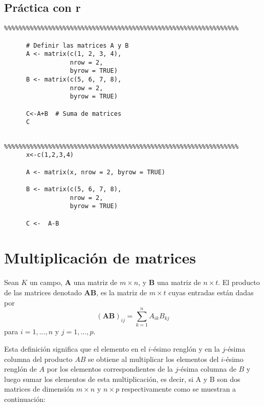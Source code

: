 \subsection{Práctica con r}

\begin{verbatim}
%%%%%%%%%%%%%%%%%%%%%%%%%%%%%%%%%%%%%%%%%%%%%%%%%%%%%%%%%%%%%%%%    

      # Definir las matrices A y B
      A <- matrix(c(1, 2, 3, 4), 
                  nrow = 2, 
                  byrow = TRUE)
      B <- matrix(c(5, 6, 7, 8),
                  nrow = 2,
                  byrow = TRUE)

      C<-A+B  # Suma de matrices
      C
\end{verbatim}


\begin{verbatim}

%%%%%%%%%%%%%%%%%%%%%%%%%%%%%%%%%%%%%%%%%%%%%%%%%%%%%%%%%%%%%%%%
      x<-c(1,2,3,4)

      A <- matrix(x, nrow = 2, byrow = TRUE)

      B <- matrix(c(5, 6, 7, 8), 
                  nrow = 2,
                  byrow = TRUE)

      C <-  A-B
\end{verbatim}


\section{Multiplicación de matrices} 

\begin{definition}
Sean $K$ un campo, $\boldsymbol{A}$ una matriz de $m\times n$, y $\boldsymbol{B}$ una matriz
de $n\times t$. El producto de las matrices  denotado $\boldsymbol{AB}$, es la matriz de $m\times t$ cuyas entradas están dadas por\\
$$
\boldsymbol{(AB)}_{ij} = \sum_{k=1}^{n} A_{ik}B_{kj}
$$
para $i=1,...,n$ y $j=1,...,p$. 
\end{definition}


Esta definición significa que el elemento en el $i$-ésimo renglón y en la $j$-ésima columna del producto $AB$ se obtiene al multiplicar los elementos del $i$-ésimo renglón de $A$ por los elementos correspondientes de la $j$-ésima columna de $B$ y
luego sumar los elementos de esta multiplicación, es decir, si A y B son dos matrices de dimensión $m\times n$ y $n\times p$ respectivamente  como se muestran a continuación:


